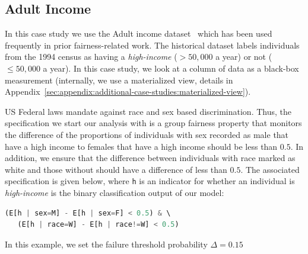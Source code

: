\subsection{Adult Income}
\label{sec:casestudy:adult}

In this case study we use the Adult income dataset~\citep{kohavi1996scaling} which has been used frequently in prior fairness-related work.
The historical dataset labels individuals from the 1994 census as having a \emph{high-income} ($>50,000$ a year) or not ($\leq50,000$ a year).
In this case study, we look at a column of data as a black-box measurement (internally, we use a materialized view, details in Appendix~\ref{sec:appendix:additional-case-studies:materialized-view}).


US Federal laws mandate against race and sex based discrimination.
Thus, the specification we start our analysis with is a group fairness property that monitors the difference of the proportions of individuals with sex recorded as male that have a high income to females that have a high income should be less than $0.5$. In addition, we ensure that the difference between individuals with race marked as white and those without should have a difference of less than $0.5$.  
The associated specification is given below, where \texttt{h} is an indicator for whether an individual is \emph{high-income} is the binary classification output of our model:

\begin{lstlisting}[columns=flexible, language=Python]
   (E[h | sex=M] - E[h | sex=F] < 0.5) & \ 
   (E[h | race=W] - E[h | race!=W] < 0.5)
\end{lstlisting}

In this example, we set the failure threshold probability $\Delta = 0.15$

